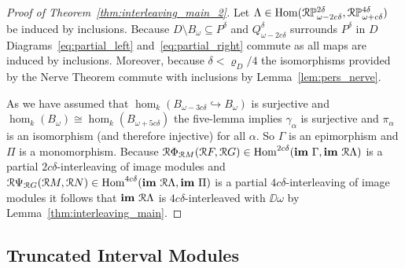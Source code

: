 \begin{proof}[Proof of Theorem~\ref{thm:interleaving_main_2}]
  Let $\Lambda\in\mathrm{Hom}(\mathcal{R}\mathbb{P}_{\omega-2c\delta}^{2\delta}, \mathcal{R}\mathbb{P}_{\omega+c\delta}^{4\delta})$ be induced by inclusions.
  Because $D\setminus B_\omega\subseteq P^\delta$ and $Q_{\omega-2c\delta}^\delta$ surrounds $P^\delta$ in $D$ Diagrams~\ref{eq:partial_left} and~\ref{eq:partial_right} commute as all maps are induced by inclusions.
  Moreover, because $\delta < \varrho_D/4$ the isomorphisms provided by the Nerve Theorem commute with inclusions by Lemma~\ref{lem:pers_nerve}.

  As we have assumed that $\hom_k(B_{\omega-3c\delta}\hookrightarrow B_\omega)$ is surjective and $\hom_k(B_\omega)\cong\hom_k(B_{\omega+5c\delta})$ the five-lemma implies $\gamma_\alpha$ is surjective and $\pi_\alpha$ is an isomorphism (and therefore injective) for all $\alpha$.
  So $\Gamma$ is an epimorphism and $\Pi$ is a monomorphism.
  Because $\mathcal{R} \Phi_{\mathcal{R} M}(\mathcal{R} F, \mathcal{R} G)\in\mathrm{Hom}^{2c\delta}(\mathbf{im}~\Gamma,\mathbf{im}~\mathcal{R}\Lambda)$ is a partial $2c\delta$-interleaving of image modules and $\mathcal{R} \Psi_{\mathcal{R} G} (\mathcal{R} M,\mathcal{R} N)\in\mathrm{Hom}^{4c\delta}(\mathbf{im}~\mathcal{R}\Lambda, \mathbf{im}~\Pi)$ is a partial $4c\delta$-interleaving of image modules it follows that $\mathbf{im}~\mathcal{R}\Lambda$ is $4c\delta$-interleaved with $\DD{\omega}$ by Lemma~\ref{thm:interleaving_main}.
\end{proof}

\subsection{Truncated Interval Modules}

